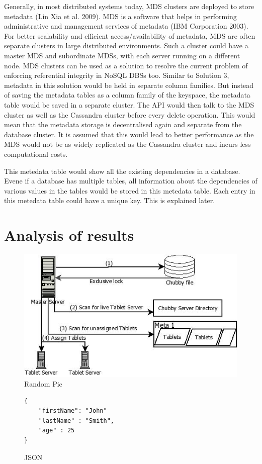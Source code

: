 Generally, in most distributed systems today, MDS clusters are deployed to store
metadata (Lin Xia et al. 2009). MDS is a software that helps in performing
administrative and management services of metadata (IBM Corporation 2003). For
better scalability and efficient access/availability of metadata, MDS are often
separate clusters in large distributed environments. Such a cluster could have
a master MDS and subordinate MDSs, with each server running on a different node.
MDS clusters can be used as a solution to resolve the current problem of
enforcing referential integrity in NoSQL DBSs too. Similar to Solution 3,
metadata in this solution would be held in separate column families. But instead
of saving the metadata tables as a column family of the keyspace, the metadata
table would be saved in a separate cluster. The API would then talk to the MDS
cluster as well as the Cassandra cluster before every delete operation.
This would mean that the metadata storage is decentralised again and separate
from the database cluster. It is assumed that this would lead to better
performance as the MDS would not be as widely replicated as the Cassandra
cluster and incurs less computational costs.


This metedata table would show all the existing dependencies in a database.
Evene if a database has multiple tables, all information about the dependencies
of various values in the tables would be stored in this metedata table. Each
entry in this metedata table could have a unique key. This is explained later.

\section{Analysis of results}\label{s:summary}

\begin{figure}
	\centering
	\includegraphics[width=.5\textwidth]{./figure/random.jpg}
	\caption{Random Pic}\label{f:random-pic}
\end{figure}


\begin{figure}

\begin{verbatim}
{
    "firstName": "John"
    "lastName" : "Smith",
    "age" : 25
}
\end{verbatim}
\caption{JSON}
\end{figure}
